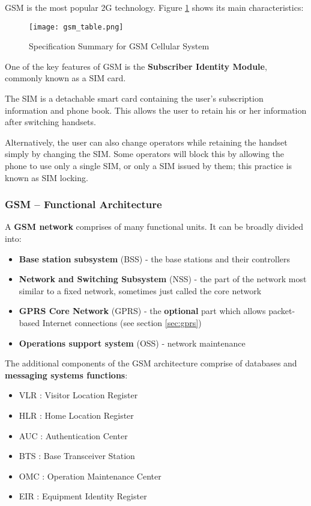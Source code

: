 GSM is the most popular 2G technology. Figure \ref{fig:gsm_table} shows its
main characteristics:

\begin{figure}[H]
  \centering
  \texttt{[image: gsm\_table.png]}
  \caption{Specification Summary for GSM Cellular System }
  \label{fig:gsm_table}
\end{figure}

One of the key features of GSM is the \textbf{Subscriber Identity Module},
commonly known as a SIM card.

The SIM is a detachable smart card containing the user's subscription
information and phone book. This allows the user to retain his or her
information after switching handsets.

Alternatively, the user can also change operators while retaining the handset
simply by changing the SIM. Some operators will block this by allowing the
phone to use only a single SIM, or only a SIM issued by them; this practice
is known as SIM locking.

\subsubsection{GSM – Functional Architecture}

A \textbf{GSM network} comprises of many functional units.
It can be broadly divided into:

\begin{itemize}
  \item \textbf{Base station subsystem} (BSS) - the base stations and their
controllers
  \item \textbf{Network and Switching Subsystem} (NSS) - the part of the
network most similar to a fixed network, sometimes just called the core network
  \item \textbf{GPRS Core Network} (GPRS) - the \textbf{optional} part which
allows packet-based Internet connections (see section \ref{sec:gprs})
  \item \textbf{Operations support system} (OSS) - network maintenance
\end{itemize}

The additional components of the GSM architecture comprise of databases and
\textbf{messaging systems functions}:

\begin{itemize}
  \item VLR : Visitor Location Register
  \item HLR : Home Location Register
  \item AUC : Authentication Center
  \item BTS : Base Transceiver Station
  \item OMC : Operation Maintenance Center
  \item EIR : Equipment Identity Register
\end{itemize}

